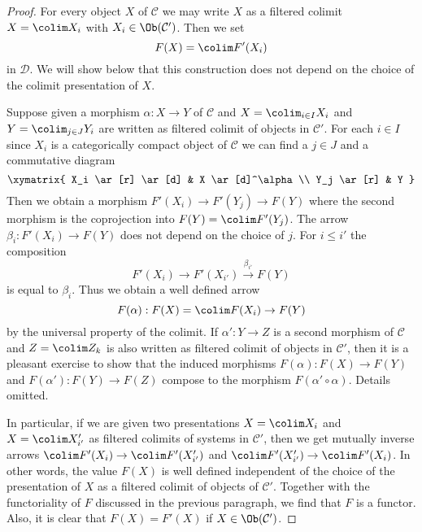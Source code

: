 \begin{proof}
For every object $X$ of $\mathcal{C}$ we may write $X$ as a filtered
colimit $X = \colim X_i$ with $X_i \in \Ob(\mathcal{C}')$. Then we set
$$
F(X) = \colim F'(X_i)
$$
in $\mathcal{D}$. We will show below that this construction does not
depend on the choice of the colimit presentation of $X$.

\medskip\noindent
Suppose given a morphism $\alpha : X \to Y$ of $\mathcal{C}$
and $X = \colim_{i \in I} X_i$ and $Y = \colim_{j \in J} Y_i$
are written as filtered colimit of objects in $\mathcal{C}'$.
For each $i \in I$ since $X_i$ is a categorically compact object of
$\mathcal{C}$ we can find a $j \in J$ and a commutative diagram
$$
\xymatrix{
X_i \ar[r] \ar[d] & X \ar[d]^\alpha \\
Y_j \ar[r] & Y
}
$$
Then we obtain a morphism $F'(X_i) \to F'(Y_j) \to F(Y)$ where the second
morphism is the coprojection into $F(Y) = \colim F'(Y_j)$. The arrow
$\beta_i : F'(X_i) \to F(Y)$ does not depend on the choice of $j$.
For $i \leq i'$ the composition
$$
F'(X_i) \to F'(X_{i'}) \xrightarrow{\beta_{i'}} F(Y)
$$
is equal to $\beta_i$. Thus we obtain a well defined arrow
$$
F(\alpha) : F(X) = \colim F(X_i) \to F(Y)
$$
by the universal property of the colimit. If $\alpha' : Y \to Z$ is a
second morphism of $\mathcal{C}$ and $Z = \colim Z_k$ is also
written as filtered colimit of objects in $\mathcal{C}'$, then
it is a pleasant exercise to show that the induced
morphisms $F(\alpha) : F(X) \to F(Y)$ and $F(\alpha') : F(Y) \to F(Z)$
compose to the morphism $F(\alpha' \circ \alpha)$. Details omitted.

\medskip\noindent
In particular, if we are given two presentations
$X = \colim X_i$ and $X = \colim X'_{i'}$ as filtered
colimits of systems in $\mathcal{C}'$, then we get mutually inverse
arrows $\colim F'(X_i) \to \colim F'(X'_{i'})$ and
$\colim F'(X'_{i'}) \to \colim F'(X_i)$. In other words, the
value $F(X)$ is well defined independent of the choice of the
presentation of $X$ as a filtered colimit of objects of $\mathcal{C}'$.
Together with the functoriality of $F$ discussed in the previous
paragraph, we find that $F$ is a functor. Also, it is clear that
$F(X) = F'(X)$ if $X \in \Ob(\mathcal{C}')$.


\end{proof}
